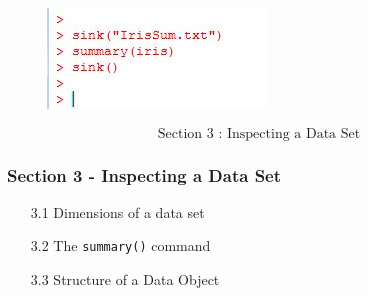 \documentclass{beamer}
\begin{document}
 	\begin{frame}
 		\begin{figure}
 			\centering
 			\includegraphics[width=1.2\linewidth]{images/sinkiris}
 		\end{figure}
 		
 	\end{frame}
 	
 	
 	\begin{frame}
 		\Huge
 		\[\mbox{ Section 3 : Inspecting a Data Set } \]
 	\end{frame}
 	\begin{frame}
 		\frametitle{Section 3 - Inspecting a Data Set }
 		\begin{itemize}
 			\item[3.1] Dimensions of a data set 
 			\item[3.2] The \texttt{summary()} command   
 			\item[3.3] Structure of a Data Object 
 		\end{itemize}
 	\end{frame}
 	
\end{document}

